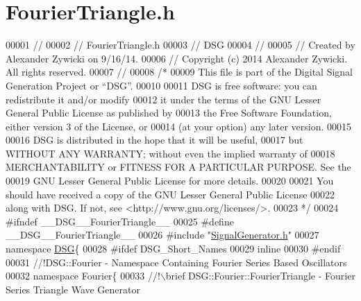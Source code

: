 \hypertarget{_fourier_triangle_8h_source}{\section{Fourier\+Triangle.\+h}
\label{_fourier_triangle_8h_source}
}

\begin{DoxyCode}
00001 \textcolor{comment}{//}
00002 \textcolor{comment}{//  FourierTriangle.h}
00003 \textcolor{comment}{//  DSG}
00004 \textcolor{comment}{//}
00005 \textcolor{comment}{//  Created by Alexander Zywicki on 9/16/14.}
00006 \textcolor{comment}{//  Copyright (c) 2014 Alexander Zywicki. All rights reserved.}
00007 \textcolor{comment}{//}
00008 \textcolor{comment}{/*}
00009 \textcolor{comment}{ This file is part of the Digital Signal Generation Project or “DSG”.}
00010 \textcolor{comment}{}
00011 \textcolor{comment}{ DSG is free software: you can redistribute it and/or modify}
00012 \textcolor{comment}{ it under the terms of the GNU Lesser General Public License as published by}
00013 \textcolor{comment}{ the Free Software Foundation, either version 3 of the License, or}
00014 \textcolor{comment}{ (at your option) any later version.}
00015 \textcolor{comment}{}
00016 \textcolor{comment}{ DSG is distributed in the hope that it will be useful,}
00017 \textcolor{comment}{ but WITHOUT ANY WARRANTY; without even the implied warranty of}
00018 \textcolor{comment}{ MERCHANTABILITY or FITNESS FOR A PARTICULAR PURPOSE.  See the}
00019 \textcolor{comment}{ GNU Lesser General Public License for more details.}
00020 \textcolor{comment}{}
00021 \textcolor{comment}{ You should have received a copy of the GNU Lesser General Public License}
00022 \textcolor{comment}{ along with DSG.  If not, see <http://www.gnu.org/licenses/>.}
00023 \textcolor{comment}{ */}
00024 \textcolor{preprocessor}{#ifndef \_\_DSG\_\_FourierTriangle\_\_}
00025 \textcolor{preprocessor}{#define \_\_DSG\_\_FourierTriangle\_\_}
00026 \textcolor{preprocessor}{#include "\hyperlink{_signal_generator_8h}{SignalGenerator.h}"}
00027 \textcolor{keyword}{namespace }\hyperlink{namespace_d_s_g}{DSG}\{
00028 \textcolor{preprocessor}{#ifdef DSG\_Short\_Names}
00029     \textcolor{keyword}{inline}
00030 \textcolor{preprocessor}{#endif}
00031 \textcolor{comment}{    //!DSG::Fourier - Namespace Containing Fourier Series Based Oscillators}
00032 \textcolor{comment}{}    \textcolor{keyword}{namespace }Fourier\{\textcolor{comment}{}
00033 \textcolor{comment}{        //!\(\backslash\)brief DSG::Fourier::FourierTriangle - Fourier Series Triangle Wave Generator}

\end{DoxyCode}
